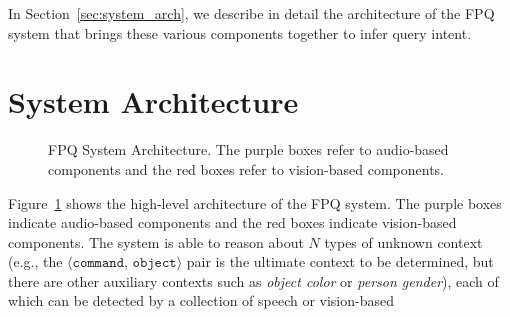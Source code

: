 \documentclass{llncs}
\begin{document}
In Section~\ref{sec:system_arch}, we describe in detail the architecture of the FPQ system that brings these various components together to infer query intent.

\section{System Architecture}
\begin{figure} [t]
\caption{FPQ System Architecture. The purple boxes refer to audio-based components and the red boxes refer to vision-based components.}
\label{fig:system_arch}
\end{figure}
\label{sec:system_arch}
Figure~\ref{fig:system_arch} shows the high-level architecture of the FPQ system.  The purple boxes indicate audio-based components and the red boxes indicate vision-based components. 
The system is able to reason about $N$ types of unknown
context (e.g., the $\langle \texttt{command, object}\rangle$ pair is the
ultimate context to be determined, but there are other auxiliary
contexts such as {\em object color} or {\em person gender}), each of
which can be detected by a collection of speech or vision-based
\end{document}
